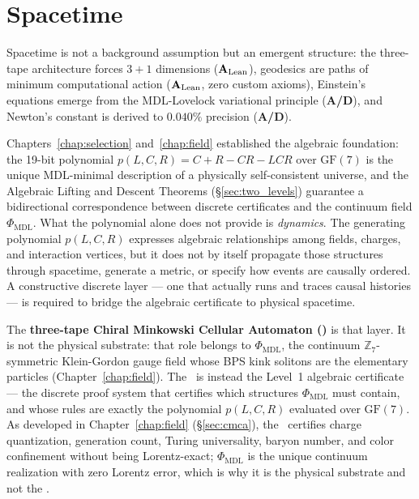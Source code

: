 \documentclass[11pt,openany]{book}
\theoremstyle{remark}
\newcommand{\PHIMDL}{\Phi_{\mathrm{MDL}}}
\newcommand{\CMCA}{\text{CMCA}}
\newcommand{\poly}{p(L,C,R)}
\newcommand{\CatAL}{\ensuremath{\textbf{A}_{\rm Lean}}}
\newcommand{\CatAD}{\textbf{A/D}}
\begin{document}
\chapter{Spacetime}
\label{chap:spacetime}

\begin{tcolorbox}[colback=blue!5,colframe=blue!50!black,title={Chapter~8 Claim}]
Spacetime is not a background assumption but an emergent structure: the three-tape
\CMCA{} architecture forces $3+1$ dimensions (\CatAL), geodesics are paths of minimum
computational action (\CatAL, zero custom axioms), Einstein's equations emerge from the
MDL-Lovelock variational principle (\CatAD), and Newton's constant is derived to
$0.040\%$ precision (\CatAD).
\end{tcolorbox}

Chapters~\ref{chap:selection} and~\ref{chap:field} established the algebraic foundation:
the 19-bit polynomial $\poly = C+R-CR-LCR$ over $\mathrm{GF}(7)$ is the unique MDL-minimal
description of a physically self-consistent universe, and the Algebraic Lifting and Descent
Theorems (\S\ref{sec:two_levels}) guarantee a bidirectional correspondence between discrete
\CMCA{} certificates and the continuum field $\PHIMDL$.
What the polynomial alone does not provide is \emph{dynamics}.
The generating polynomial $\poly$ expresses algebraic relationships among fields, charges,
and interaction vertices, but it does not by itself propagate those structures through spacetime,
generate a metric, or specify how events are causally ordered.
A constructive discrete layer --- one that actually runs and traces causal histories ---
is required to bridge the algebraic certificate to physical spacetime.

The \textbf{three-tape Chiral Minkowski Cellular Automaton (\CMCA)} is that layer.
It is not the physical substrate: that role belongs to $\PHIMDL$, the continuum
$\mathbb{Z}_7$-symmetric Klein-Gordon gauge field whose BPS kink solitons are the
elementary particles (Chapter~\ref{chap:field}).
The \CMCA\ is instead the Level~1 algebraic certificate --- the discrete proof system
that certifies which structures $\PHIMDL$ must contain, and whose rules are exactly the
polynomial $\poly$ evaluated over $\mathrm{GF}(7)$.
As developed in Chapter~\ref{chap:field} (\S\ref{sec:cmca}), the \CMCA\ certifies
charge quantization, generation count, Turing universality, baryon number, and color
confinement without being Lorentz-exact; $\PHIMDL$ is the unique continuum realization
with zero Lorentz error, which is why it is the physical substrate and not the \CMCA{}.
\end{document}
